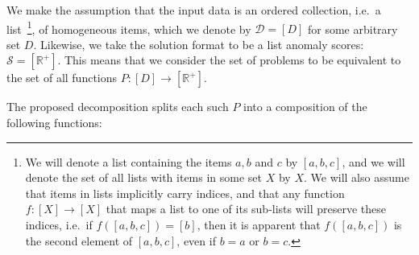 We make the assumption that the input data is an ordered collection, i.e.\ a list~\footnote{We will denote a list containing the items $a, b$ and $c$ by $[a, b, c]$, and we will denote the set of all lists with items in some set $X$ by $X$. We will also assume that items in lists implicitly carry indices, and that any function $f: [X] \rightarrow [X]$ that maps a list to one of its sub-lists will preserve these indices, i.e.\ if $f([a, b, c]) = [b]$, then it is apparent that $f([a, b, c])$ is the second element of $[a, b, c]$, even if $b = a$ or $b = c$.}, of homogeneous items, which we denote by $\mathcal{D} = [D]$ for some arbitrary set $D$. Likewise, we take the solution format to be a list anomaly scores: $\mathcal{S} = [\mathbb{R}^+]$. This means that we consider the set of problems to be equivalent to the set of all functions $P: [D] \rightarrow [\mathbb{R}^+]$.

The proposed decomposition splits each such $P$ into a composition of the following functions:

